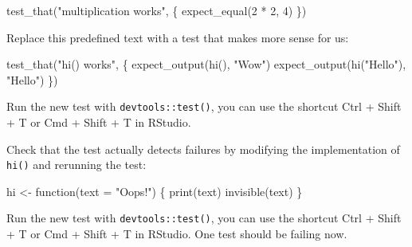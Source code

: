 \documentclass[]{book}
\newenvironment{Shaded}{}{}
\newcommand{\ControlFlowTok}[1]{\textcolor[rgb]{0.00,0.00,1.00}{#1}}
\newcommand{\DataTypeTok}[1]{#1}
\newcommand{\DecValTok}[1]{#1}
\newcommand{\KeywordTok}[1]{\textcolor[rgb]{0.00,0.00,1.00}{#1}}
\newcommand{\NormalTok}[1]{#1}
\newcommand{\OperatorTok}[1]{#1}
\newcommand{\StringTok}[1]{\textcolor[rgb]{0.00,0.50,0.50}{#1}}
\begin{document}
\begin{Shaded}
\begin{Highlighting}[]
\KeywordTok{test_that}\NormalTok{(}\StringTok{"multiplication works"}\NormalTok{, \{}
  \KeywordTok{expect_equal}\NormalTok{(}\DecValTok{2} \OperatorTok{*}\StringTok{ }\DecValTok{2}\NormalTok{, }\DecValTok{4}\NormalTok{)}
\NormalTok{\})}
\end{Highlighting}
\end{Shaded}

Replace this predefined text with a test that makes more sense for us:

\begin{Shaded}
\begin{Highlighting}[]
\KeywordTok{test_that}\NormalTok{(}\StringTok{"hi() works"}\NormalTok{, \{}
  \KeywordTok{expect_output}\NormalTok{(}\KeywordTok{hi}\NormalTok{(), }\StringTok{"Wow"}\NormalTok{)}
  \KeywordTok{expect_output}\NormalTok{(}\KeywordTok{hi}\NormalTok{(}\StringTok{"Hello"}\NormalTok{), }\StringTok{"Hello"}\NormalTok{)}
\NormalTok{\})}
\end{Highlighting}
\end{Shaded}

Run the new test with \texttt{devtools::test()}, you can use the shortcut Ctrl + Shift + T or Cmd + Shift + T in RStudio.

Check that the test actually detects failures by modifying the implementation of \texttt{hi()} and rerunning the test:

\begin{Shaded}
\begin{Highlighting}[]
\NormalTok{hi <-}\StringTok{ }\ControlFlowTok{function}\NormalTok{(}\DataTypeTok{text =} \StringTok{"Oops!"}\NormalTok{) \{}
  \KeywordTok{print}\NormalTok{(text)}
  \KeywordTok{invisible}\NormalTok{(text)}
\NormalTok{\}}
\end{Highlighting}
\end{Shaded}

Run the new test with \texttt{devtools::test()}, you can use the shortcut Ctrl + Shift + T or Cmd + Shift + T in RStudio.
One test should be failing now.

\hypertarget{section-1}{%
\chapter{}\label{section-1}}
\end{document}
